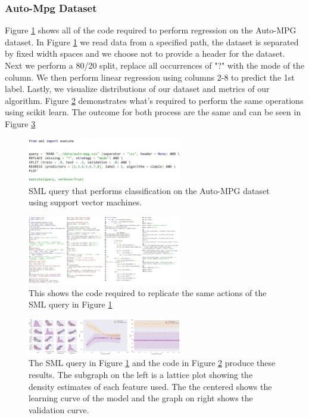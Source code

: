 \documentclass[jair,twoside,11pt,theapa]{article}
\begin{document}
\subsubsection{Auto-Mpg Dataset}
Figure \ref{fig:SML:AutoMPGQuery} shows all of the code required to perform regression on the Auto-MPG dataset. In Figure \ref{fig:SML:AutoMPGQuery} we read data from a specified path, the dataset is separated by fixed width spaces and we choose not to provide a header for the dataset.  Next we perform a 80/20 split, replace all occurrences of "?" with the mode of the column. We then perform linear regression using columns 2-8 to predict the 1st label. Lastly, we visualize distributions of our dataset and metrics of our algorithm. Figure \ref{fig:Manual:Auto-MPG} demonstrates what's required to perform the same operations using scikit learn. The outcome for both process are the same and can be seen in Figure \ref{fig:AutoMPG:Results}

\begin{figure}
\includegraphics[width=0.6\textwidth]{figs/autompg_sml.png}
\centering
\caption{SML query that performs classification on the Auto-MPG dataset using support vector machines.}
\label{fig:SML:AutoMPGQuery}
\end{figure}

\begin{figure}
\includegraphics[width=0.6\textwidth]{figs/auto-mpg_manual.png}
\centering
\caption{This shows the code required to replicate the same actions of the SML query in Figure \ref{fig:SML:AutoMPGQuery}}
\label{fig:Manual:Auto-MPG}
\end{figure}

\begin{figure}
\includegraphics[width=0.6\textwidth]{figs/auto-mpg-results.png}
\centering
\caption{The SML query in Figure \ref{fig:SML:AutoMPGQuery}  and the code in Figure \ref{fig:Manual:Auto-MPG} produce these results. The subgraph on the left is a lattice plot showing the density estimates of each feature used. The the centered shows the learning curve of the model and the graph on right shows the validation curve.}
\label{fig:AutoMPG:Results}
\end{figure}
\end{document}
